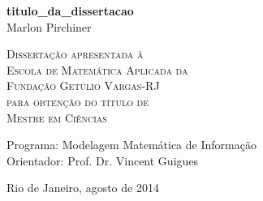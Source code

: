 \documentclass[12pt,twoside,a4paper]{book}
\numberwithin{equation}{section}
\begin{document}
\frontmatter 
\fancyhead[RO]{{\footnotesize\rightmark}\hspace{2em}\thepage}
\setcounter{tocdepth}{2}
\fancyhead[LE]{\thepage\hspace{2em}\footnotesize{\leftmark}}
\fancyhead[RE,LO]{}
\fancyhead[RO]{{\footnotesize\rightmark}\hspace{2em}\thepage}

\onehalfspacing  %

\thispagestyle{empty}
\begin{center}
    \vspace*{2.3cm}
    \textbf{\Large{\glsdesc*{titulo_da_dissertacao}}}\\
    
    \vspace*{1.2cm}
    \Large{Marlon Pirchiner}
    
    \vskip 2cm
    \textsc{
    Dissertação apresentada à\\[-0.25cm] 
    Escola de Matemática Aplicada da\\[-0.25cm]
    Fundação Getúlio Vargas-RJ\\[-0.25cm]
    para obtenção do título de \\[-0.25cm]
    Mestre em Ciências}
    
    \vskip 1.5cm
    Programa: Modelagem Matemática de Informação\\
    Orientador: Prof. Dr. Vincent Guigues\\

   	\vskip 1cm
    \normalsize{}
    
    \vskip 0.5cm
    \normalsize{Rio de Janeiro, agosto de 2014}
\end{center}

%
%
\end{document}
